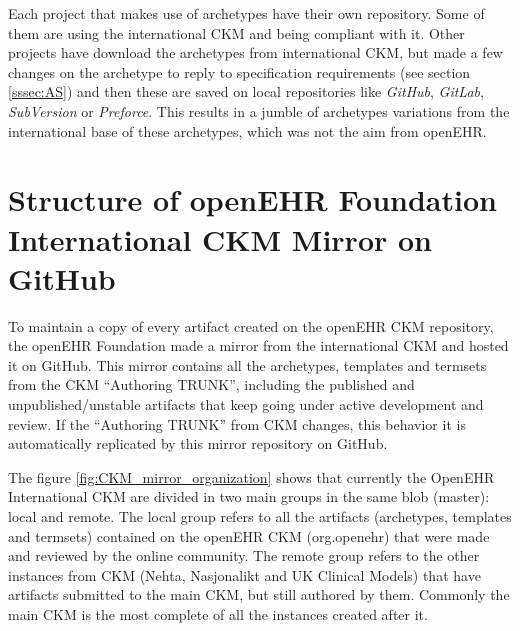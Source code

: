 \documentclass[mim_thesis.tex]{subfiles}
\begin{document}
Each project that makes use of archetypes have their own repository. Some of them are using the international CKM and being compliant with it. Other projects have download the archetypes from international CKM, but made a few changes on the archetype to reply to specification requirements (see section \ref{sssec:AS}) and then these are saved on local repositories like \textit{GitHub}, \textit{GitLab}, \textit{SubVersion} or \textit{Preforce}. This results in a jumble of archetypes variations from the international base of these archetypes, which was not the aim from openEHR. 

\section{Structure of openEHR Foundation International CKM Mirror on GitHub}
To maintain a copy of every artifact created on the openEHR CKM repository, the openEHR Foundation made a mirror from the international CKM and hosted it on GitHub. This mirror contains all the archetypes, templates and termsets from the CKM “Authoring TRUNK”, including the published and unpublished/unstable artifacts that keep going under active development and review. If the “Authoring TRUNK” from CKM changes, this behavior it is automatically replicated by this mirror repository on GitHub. 

The figure \ref{fig:CKM_mirror_organization} shows that currently the OpenEHR International CKM are divided in two main groups in the same blob (master): local and remote. The local group refers to all the artifacts (archetypes, templates and termsets) contained on the openEHR CKM (org.openehr) that were made and reviewed by the online community. The remote group refers to the other instances from CKM (Nehta, Nasjonalikt and UK Clinical Models) that have artifacts submitted to the main CKM, but still authored by them. Commonly the main CKM is the most complete of all the instances created after it. 
\end{document}
